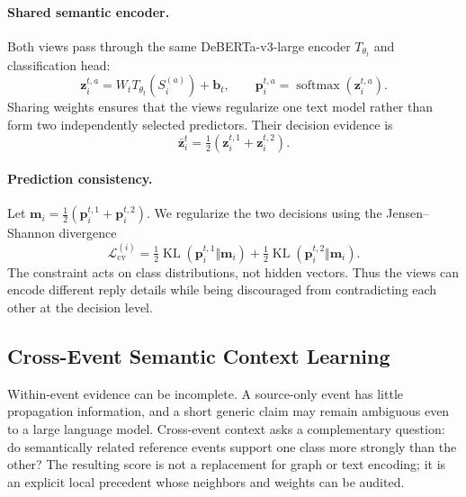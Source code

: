 \documentclass[sigconf,anonymous,review]{../acmart/acmart}
\newcommand{\softmax}{\operatorname{softmax}}
\begin{document}
\paragraph{Shared semantic encoder.}
Both views pass through the same DeBERTa-v3-large encoder $T_{\theta_t}$ and
classification head:
\begin{equation}
  \boldsymbol{z}_i^{t,a}
  =W_tT_{\theta_t}(S_i^{(a)})+\boldsymbol{b}_t,\qquad
  \boldsymbol{p}_i^{t,a}=\softmax(\boldsymbol{z}_i^{t,a}).
  \label{eq:text-logits}
\end{equation}
Sharing weights ensures that the views regularize one text model rather than
form two independently selected predictors.  Their decision evidence is
\begin{equation}
  \bar{\boldsymbol{z}}_i^t
  =\tfrac{1}{2}
  (\boldsymbol{z}_i^{t,1}+\boldsymbol{z}_i^{t,2}).
  \label{eq:text-average}
\end{equation}

\paragraph{Prediction consistency.}
Let
$\boldsymbol{m}_i=\tfrac{1}{2}
(\boldsymbol{p}_i^{t,1}+\boldsymbol{p}_i^{t,2})$.
We regularize the two decisions using the Jensen--Shannon
divergence
\begin{equation}
  \mathcal{L}_{\mathrm{cv}}^{(i)}
  =\tfrac{1}{2}\operatorname{KL}
  (\boldsymbol{p}_i^{t,1}\Vert\boldsymbol{m}_i)
  +\tfrac{1}{2}\operatorname{KL}
  (\boldsymbol{p}_i^{t,2}\Vert\boldsymbol{m}_i).
  \label{eq:gjsd}
\end{equation}
The constraint acts on class distributions, not hidden vectors.  Thus the
views can encode different reply details while being discouraged from
contradicting each other at the decision level.

\subsection{Cross-Event Semantic Context Learning}
\label{sec:context}

Within-event evidence can be incomplete.  A source-only event has little
propagation information, and a short generic claim may remain ambiguous even
to a large language model.  Cross-event context asks a complementary
question: do semantically related reference events support one class more
strongly than the other?  The resulting score is not a replacement for graph
or text encoding; it is an explicit local precedent whose neighbors and
weights can be audited.
\end{document}
